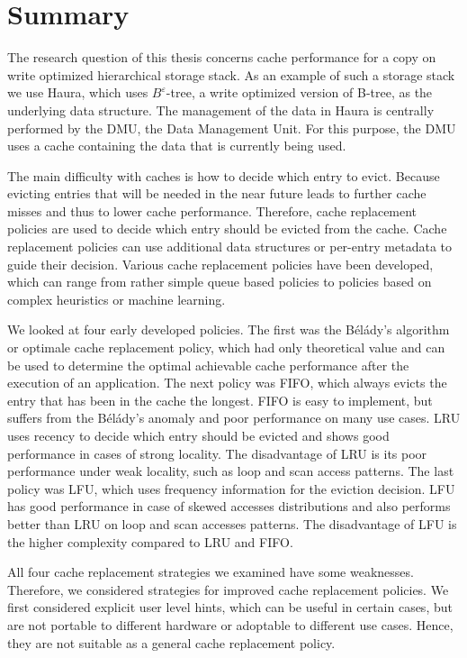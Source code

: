 \documentclass[
	12pt,
	a4paper,
	abstract,
	bibliography=totoc,
	chapterprefix,
	headings=openright,
	numbers=endperiod,
	parskip=half,
	twoside,
]{scrreprt}
\begin{document}
\section{Summary}
\label{sec:summary}

The research question of this thesis concerns cache performance for a copy on write optimized hierarchical storage stack.
As an example of such a storage stack we use Haura, which uses $B^{\varepsilon}$-tree, a write optimized version of B-tree,
as the underlying data structure.
The management of the data in Haura is centrally performed by the DMU, the Data Management Unit.
For this purpose, the DMU uses a cache containing the data that is currently being used. 

The main difficulty with caches is how to decide which entry to evict.
Because evicting entries that will be needed in the near future leads to further 
cache misses and thus to lower cache performance.
Therefore, cache replacement policies are used to decide which entry should be evicted from the cache.
Cache replacement policies can use additional data structures or per-entry metadata to guide their decision.
Various cache replacement policies have been developed, which can range from rather simple queue based policies to policies based 
on complex heuristics or machine learning.

We looked at four early developed policies.
The first was  the Bélády's algorithm or optimale cache replacement policy,
which had only theoretical value and can be used to determine the optimal achievable cache performance 
after the execution of an application.
The next policy was FIFO, which always evicts the entry that has been in the cache the longest.
FIFO is easy to implement, but suffers from the Bélády's anomaly and poor performance on many use cases. 
LRU uses recency to decide which entry should be evicted and shows good performance in cases of strong locality.
The disadvantage of LRU is its poor performance under weak locality, such as loop and scan access patterns.
The last policy was LFU, which uses frequency information for the eviction decision.
LFU has good performance in case of skewed accesses distributions and 
also performs better than LRU on loop and scan accesses patterns.
The disadvantage of LFU is the higher complexity compared to LRU and FIFO.

All four cache replacement strategies we examined have some weaknesses.
Therefore, we considered strategies for improved cache replacement policies.
We first considered explicit user level hints, which can be useful in certain cases, 
but are not portable to different hardware or adoptable to different use cases.
Hence, they are not suitable as a general cache replacement policy.
\end{document}
